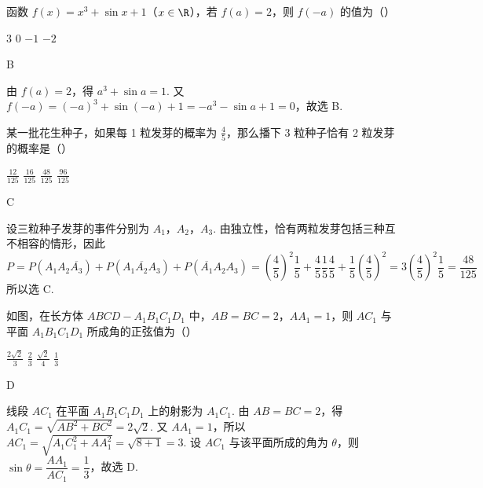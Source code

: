 \begin{problem}
函数 \(f(x) = x^3 + \sin x + 1\)（\(x \in \R\)），若 \(f(a) = 2\)，则 \(f(-a)\) 的值为（\quad）

\choices
    {3}
    {0}
    {\(-1\)}
    {\(-2\)}

\begin{answer}
B
\end{answer}

\begin{solution}
由 \(f(a)=2\)，得 \(a^3+\sin a=1\). 又 \(f(-a)=(-a)^3+\sin(-a)+1=-a^3-\sin a+1=0\)，故选 B.
\end{solution}
\end{problem}

\begin{problem}
某一批花生种子，如果每 1 粒发芽的概率为 \(\frac{4}{5}\)，那么播下 3 粒种子恰有 2 粒发芽的概率是（\quad）

\choices
    {\(\frac{12}{125}\)}
    {\(\frac{16}{125}\)}
    {\(\frac{48}{125}\)}
    {\(\frac{96}{125}\)}

\begin{answer}
C
\end{answer}

\begin{solution}
设三粒种子发芽的事件分别为 \(A_1\)，\(A_2\)，\(A_3\). 由独立性，恰有两粒发芽包括三种互不相容的情形，因此
\[
P=P(A_1A_2\overline{A_3})+P(A_1\overline{A_2}A_3)+P(\overline{A_1}A_2A_3)
=\left(\frac45\right)^2\frac15+\frac45\frac15\frac45+\frac15\left(\frac45\right)^2
=3\left(\frac45\right)^2\frac15=\frac{48}{125}
\]
所以选 C.
\end{solution}
\end{problem}

\begin{problem}
如图，在长方体 \(ABCD - A_{1}B_{1}C_{1}D_{1}\) 中，\(AB = BC = 2\)，\(AA_{1} = 1\)，则 \(AC_{1}\) 与平面 \(A_{1}B_{1}C_{1}D_{1}\) 所成角的正弦值为（\quad）


\choices
    {\(\frac{2\sqrt{2}}{3}\)}
    {\(\frac{2}{3}\)}
    {\(\frac{\sqrt{2}}{4}\)}
    {\(\frac{1}{3}\)}

\begin{answer}
D
\end{answer}

\begin{solution}
线段 \(AC_1\) 在平面 \(A_1B_1C_1D_1\) 上的射影为 \(A_1C_1\). 由 \(AB=BC=2\)，得 \(A_1C_1=\sqrt{AB^2+BC^2}=2\sqrt2\). 又 \(AA_1=1\)，所以 \(AC_1=\sqrt{A_1C_1^2+AA_1^2}=\sqrt{8+1}=3\). 设 \(AC_1\) 与该平面所成的角为 \(\theta\)，则 \(\sin\theta=\dfrac{AA_1}{AC_1}=\dfrac13\)，故选 D.
\end{solution}
\end{problem}

